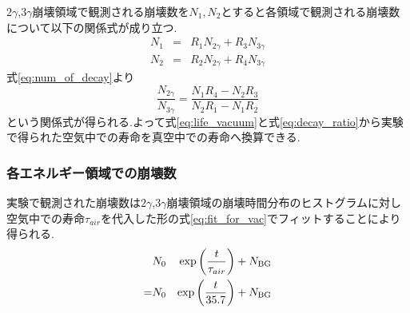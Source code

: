 $2\gamma$,$3\gamma$崩壊領域で観測される崩壊数を$N_1,N_2$とすると各領域で観測される崩壊数について以下の関係式が成り立つ.
\begin{eqnarray}
	N_1&=&R_1N_{2\gamma}+R_3N_{3\gamma} \\
	N_2&=&R_2N_{2\gamma}+R_4N_{3\gamma}
	\label{eq:num_of_decay}
\end{eqnarray}
式\ref{eq:num_of_decay}より
\begin{equation}
	\frac{N_{2\gamma}}{N_{3\gamma}}=\frac{N_1R_4-N_2R_3}{N_2R_1-N_1R_2}
	\label{eq:decay_ratio}
\end{equation}
という関係式が得られる.よって式\ref{eq:life_vacuum}と式\ref{eq:decay_ratio}から実験で得られた空気中での寿命を真空中での寿命へ換算できる.

\subsubsection{各エネルギー領域での崩壊数}
実験で観測された崩壊数は$2\gamma$,$3\gamma$崩壊領域の崩壊時間分布のヒストグラムに対し空気中での寿命$\tau_{air}$を代入した形の式\ref{eq:fit_for_vac}でフィットすることにより得られる.
\begin{eqnarray}
	&N_0&\exp\left(\frac{t}{\tau_{air}}\right)+N_{\rm BG} \nonumber \\
	=&N_0&\exp\left(\frac{t}{35.7}\right)+N_{\rm BG} 
	\label{eq:fit_for_vac}
\end{eqnarray}

